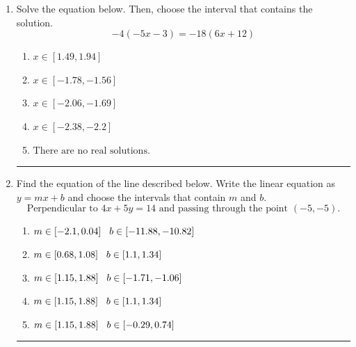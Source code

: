 \documentclass[14pt]{extbook}
\newcommand{\litem}[1]{\item#1\hspace*{-1cm}\rule{\textwidth}{0.4pt}}
\begin{document}
\begin{enumerate}
{\begin{enumerate}[label=\Alph*.]
\end{enumerate} }
\litem{
Solve the equation below. Then, choose the interval that contains the solution.\[ -4(-5x -3) = -18(6x + 12) \]\begin{enumerate}[label=\Alph*.]
\item \( x \in [1.49, 1.94] \)
\item \( x \in [-1.78, -1.56] \)
\item \( x \in [-2.06, -1.69] \)
\item \( x \in [-2.38, -2.2] \)
\item \( \text{There are no real solutions.} \)

\end{enumerate} }
\litem{
Find the equation of the line described below. Write the linear equation as $ y=mx+b $ and choose the intervals that contain $m$ and $b$.\[ \text{Perpendicular to } 4 x + 5 y = 14 \text{ and passing through the point } (-5, -5). \]\begin{enumerate}[label=\Alph*.]
\item \( m \in [-2.1, 0.04] \hspace*{3mm} b \in [-11.88, -10.82] \)
\item \( m \in [0.68, 1.08] \hspace*{3mm} b \in [1.1, 1.34] \)
\item \( m \in [1.15, 1.88] \hspace*{3mm} b \in [-1.71, -1.06] \)
\item \( m \in [1.15, 1.88] \hspace*{3mm} b \in [1.1, 1.34] \)
\item \( m \in [1.15, 1.88] \hspace*{3mm} b \in [-0.29, 0.74] \)


\end{enumerate}}
\end{enumerate}
\end{document}
